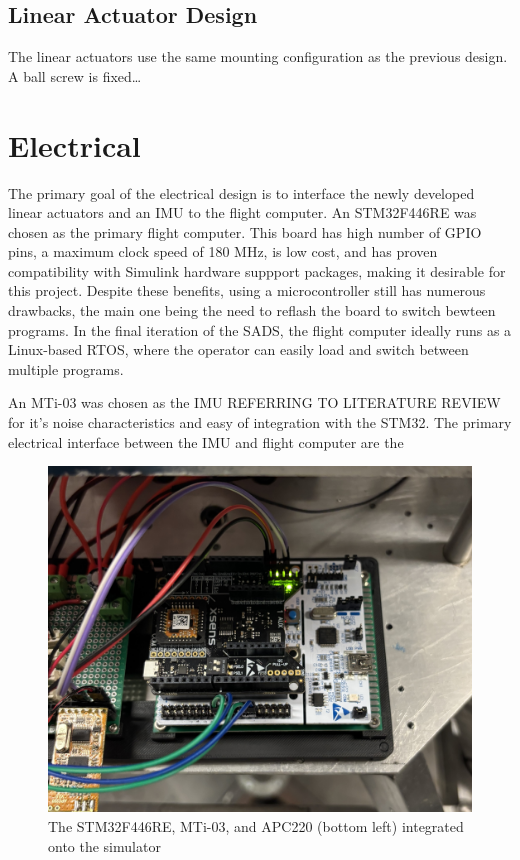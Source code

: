 
\subsection{Linear Actuator Design}

The linear actuators use the same mounting configuration as the previous design. A ball screw is fixed\dots




\section{Electrical}

The primary goal of the electrical design is to interface the newly developed linear actuators and an IMU to the flight computer. An STM32F446RE was chosen as the primary flight computer. This board has high number of GPIO pins, a maximum clock speed of 180 MHz, is low cost, and has proven compatibility with Simulink hardware suppport packages, making it desirable for this project. Despite these benefits, using a microcontroller still has numerous drawbacks, the main one being the need to reflash the board to switch bewteen programs. In the final iteration of the SADS, the flight computer ideally runs as a Linux-based RTOS, where the operator can easily load and switch between multiple programs. 

An MTi-03 was chosen as the IMU REFERRING TO LITERATURE REVIEW for it's noise characteristics and easy of integration with the STM32. The primary electrical interface between the IMU and flight computer are the  

\begin{figure}[h]\label{fig:OBC}
    \centering
    \includegraphics[width=0.80\linewidth]{figures/OBC.jpg}
    \caption{The STM32F446RE, MTi-03, and APC220 (bottom left) integrated onto the simulator}

\end{figure}


